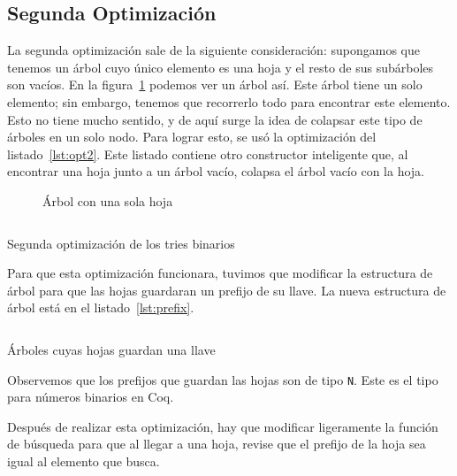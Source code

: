 \documentclass[11pt,letterpaper]{article}
\begin{document}
\subsection{Segunda Optimización}
\noindent La segunda optimización sale de la siguiente consideración: supongamos que tenemos un árbol cuyo único elemento es una hoja y el resto de sus subárboles son vacíos. En la figura~\ref{fig:arbol_chafa} podemos ver un árbol así. Este árbol tiene un solo elemento; sin embargo, tenemos que recorrerlo todo para encontrar este elemento. Esto no tiene mucho sentido, y de aquí surge la idea de colapsar este tipo de árboles en un solo nodo. Para lograr esto, se usó la optimización del listado~\ref{lst:opt2}. Este listado contiene otro constructor inteligente que, al encontrar una hoja junto a un árbol vacío, colapsa el árbol vacío con la hoja.

\begin{figure}[h]
  \caption{Árbol con una sola hoja}
  \label{fig:arbol_chafa}
   \centering
\end{figure}

\begin{listing}[H]
  \inputminted{coq}{src/smart2.v}
  \caption{Segunda optimización de los tries binarios}
  \label{lst:opt2}
\end{listing}

Para que esta optimización funcionara, tuvimos que modificar la estructura de árbol para que las hojas guardaran un prefijo de su llave. La nueva estructura de árbol está en el listado~\ref{lst:prefix}.

\begin{listing}[H]
  \inputminted{coq}{src/prefix.v}
  \caption{Árboles cuyas hojas guardan una llave}
  \label{lst:prefix}
\end{listing}

Observemos que los prefijos que guardan las hojas son de tipo \texttt{N}. Este es el tipo para números binarios en Coq.

Después de realizar esta optimización, hay que modificar ligeramente la función de búsqueda para que al llegar a una hoja, revise que el prefijo de la hoja sea igual al elemento que busca.
\end{document}
